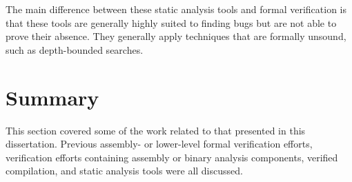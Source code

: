The main difference between these static analysis tools and formal verification
is that these tools are generally highly suited to finding bugs
but are not able to prove their absence.
They generally apply techniques that are formally unsound, such as depth-bounded searches.

\section{Summary}
This section covered some of the work related to that presented in this dissertation.
Previous assembly- or lower-level formal verification efforts,
verification efforts containing assembly or binary analysis components,
verified compilation, and static analysis tools were all discussed.
